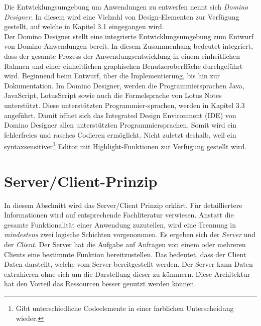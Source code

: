 Die Entwicklungsumgebung um Anwendungen zu entwerfen nennt sich \textit{Domino Designer}. 
In diesem wird eine Vielzahl von Design-Elementen zur Verfügung gestellt, auf welche in Kapitel 3.1 eingegangen  wird\cite{mann}.\\
Der Domino Designer stellt eine integrierte Entwicklungsumgebung zum Entwurf von Domino-Anwendungen bereit. In diesem Zusammenhang bedeutet
integriert, dass der gesamte Prozess der Anwendungsentwicklung in einem einheitlichen Rahmen und einer einheitlichen graphischen Benutzeroberfläche
durchgeführt wird.
Beginnend beim Entwurf, über die Implementierung, bis hin zur Dokumentation\cite{knaepper}.\newline
Im Domino Designer, werden die Programmiersprachen Java, JavaScript, LotusScript sowie auch die Formelsprache von Lotus Notes unterstützt.
Diese unterstützten Programmier-\linebreak sprachen, werden in Kapitel 3.3 angeführt. Damit öffnet sich das Integrated Design \linebreak
 Environment (IDE) von Domino Designer allen 
unterstützten Programmiersprachen. Somit wird ein fehlerfreies und rasches Codieren ermöglicht. Nicht zuletzt deshalb, weil ein 
syntaxsensitiver\footnote{Gibt unterschiedliche Codeelemente in einer farblichen Unterscheidung  wieder.} Editor mit Highlight-Funktionen zur
Verfügung gestellt wird\cite{mann}.\\


\section{Server/Client-Prinzip}
\label{sec:2allgemein}

In diesem Abschnitt wird das Server/Client Prinzip erklärt. Für detailliertere Informationen wird auf entsprechende Fachliteratur verwiesen.\newline
Anstatt die gesamte Funktionalität einer Anwendung zuzuteilen, wird eine Trennung in \linebreak \textit{mindestens} zwei logische Schichten vorgenommen.
Es ergeben sich der \textit{Server} und der \linebreak \textit{Client}. Der Server hat die Aufgabe auf Anfragen von einem oder mehreren Clients eine \linebreak
bestimmte Funktion bereitzustellen.
Das bedeutet, dass der Client Daten darstellt, welche vom Server bereitgestellt werden. Der Server kann Daten extrahieren ohne sich um die 
Darstellung \linebreak dieser zu kümmern. Diese Architektur hat den Vorteil das Ressourcen besser genutzt werden \linebreak können\cite{knaepper}.

